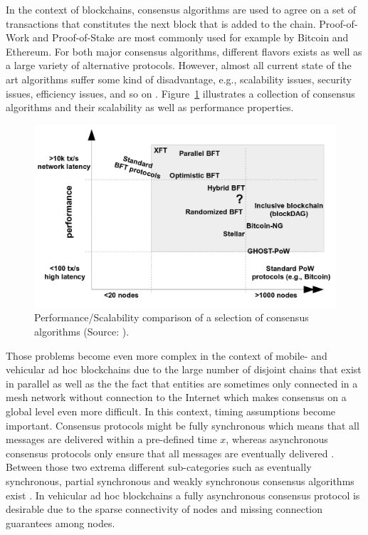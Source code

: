 \documentclass{llncs}
\begin{document}
{			In the context of blockchains, consensus algorithms are used to agree on a set of transactions that constitutes the next block that is added to the chain. Proof-of-Work \cite{nakamoto_bitcoin:2008} and Proof-of-Stake \cite{king2012ppcoin} are most commonly used for example by Bitcoin and Ethereum. For both major consensus algorithms, different flavors exists as well as a large variety of alternative protocols. However, almost all current state of the art algorithms suffer some kind of disadvantage, e.g., scalability issues, security issues, efficiency issues, and so on \cite{gervais2016security}\cite{houy2014will}. Figure~\ref{fig:bft-scalability} illustrates a collection of consensus algorithms and their scalability as well as performance properties. 
			\begin{figure}
				\centering
				\includegraphics[scale=0.25]{Figures/BFT/20180904_BFT-scalability.png}
				\caption{Performance/Scalability comparison of a selection of consensus algorithms (Source: \cite{vukolic2015quest}).}
				\label{fig:bft-scalability}
			\end{figure}
			Those problems become even more complex in the  context of mobile- and vehicular ad hoc blockchains due to the large number of disjoint chains that exist in parallel as well as the the fact that entities are sometimes only connected in a mesh network without connection to the Internet which makes consensus on a global level even more difficult. In this context, timing assumptions become important. Consensus protocols might be fully synchronous which means that all messages are delivered within a pre-defined time  $x$, whereas asynchronous consensus protocols only ensure that all messages are eventually delivered \cite{miller2016honey}. Between those two extrema different sub-categories such as eventually synchronous, partial synchronous and weakly synchronous consensus algorithms exist \cite{miller2016honey}. In vehicular ad hoc blockchains a fully asynchronous consensus protocol is  desirable due to the sparse connectivity of nodes and missing connection guarantees among nodes.
						
}
\end{document}

